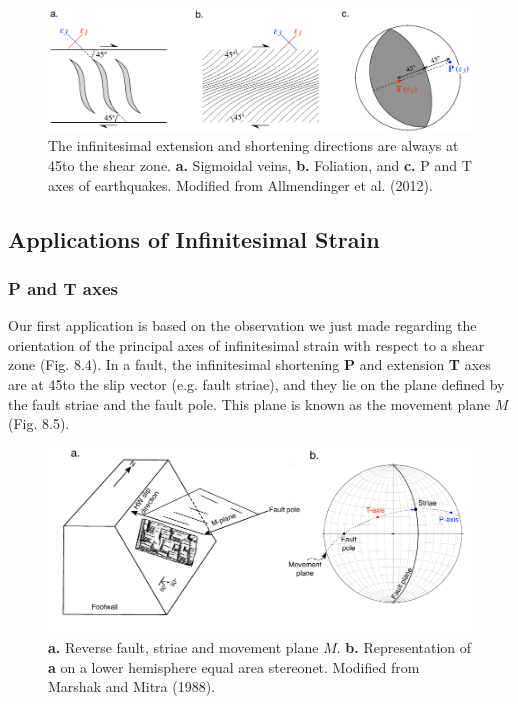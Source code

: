 \documentclass[a4paper , 12pt]{book}
\begin{document}
\begin{figure}[ht]
    \centering
    \includegraphics[width=13.0cm]{ch8f4.pdf}
    \caption{The infinitesimal extension and shortening directions are always at 45\degree\space to the shear zone. \textbf{a.} Sigmoidal veins, \textbf{b.} Foliation, and \textbf{c.} P and T axes of earthquakes. Modified from Allmendinger et al. (2012).}
\end{figure}

\subsection{Applications of Infinitesimal Strain}\label{applInfStrain}

\subsubsection{\textbf{P} and \textbf{T} axes}

Our first application is based on the observation we just made regarding the orientation of the principal axes of infinitesimal strain with respect to a shear zone (Fig. 8.4). In a fault, the infinitesimal shortening \textbf{P} and extension \textbf{T} axes are at 45\degree\space to the slip vector (e.g. fault striae), and they lie on the plane defined by the fault striae and the fault pole. This plane is known as the movement plane $M$ (Fig. 8.5).

\begin{figure}[ht]
    \centering
    \includegraphics[width=12.0cm]{ch8f5.pdf}
    \caption{\textbf{a.} Reverse fault, striae and movement plane $M$. \textbf{b.} Representation of \textbf{a} on a lower hemisphere equal area stereonet. Modified from Marshak and Mitra (1988).}
\end{figure}
\end{document}
